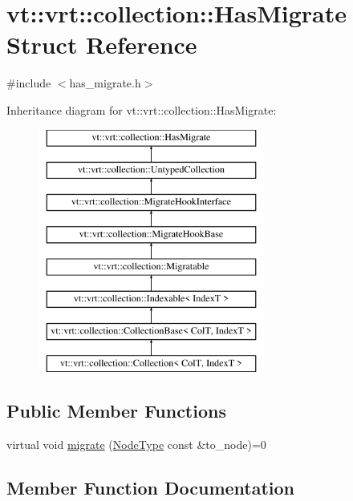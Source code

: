 \hypertarget{structvt_1_1vrt_1_1collection_1_1_has_migrate}{}\section{vt\+:\+:vrt\+:\+:collection\+:\+:Has\+Migrate Struct Reference}
\label{structvt_1_1vrt_1_1collection_1_1_has_migrate}


{\ttfamily \#include $<$has\+\_\+migrate.\+h$>$}

Inheritance diagram for vt\+:\+:vrt\+:\+:collection\+:\+:Has\+Migrate\+:\begin{figure}[H]
\begin{center}
\leavevmode
\includegraphics[height=8.000000cm]{structvt_1_1vrt_1_1collection_1_1_has_migrate}
\end{center}
\end{figure}
\subsection*{Public Member Functions}
\begin{DoxyCompactItemize}
\item 
virtual void \hyperlink{structvt_1_1vrt_1_1collection_1_1_has_migrate_a6cd6f43660771bf45e205e4c8ee7ff90}{migrate} (\hyperlink{namespacevt_a866da9d0efc19c0a1ce79e9e492f47e2}{Node\+Type} const \&to\+\_\+node)=0
\end{DoxyCompactItemize}


\subsection{Member Function Documentation}
\mbox{\label{structvt_1_1vrt_1_1collection_1_1_has_migrate_a6cd6f43660771bf45e205e4c8ee7ff90}} 
